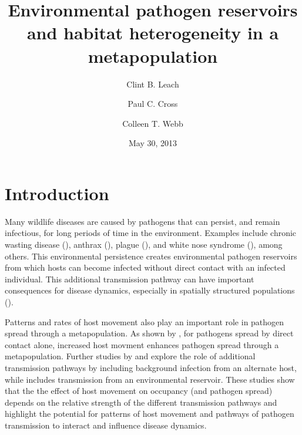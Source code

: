 \documentclass{svjour3}
\begin{document}
\title{Environmental pathogen reservoirs and habitat heterogeneity in a metapopulation}

\author{Clint B. Leach \and Paul C. Cross \and Colleen T. Webb}


\date{May 30, 2013}


\maketitle

\section{Introduction}
\label{intro}

Many wildlife diseases are caused by pathogens that can persist, and remain infectious, for long periods of time in the environment.  Examples include chronic wasting disease (\cite{Miller2006}), anthrax (\cite{Dragon1995}), plague (\cite{Eisen2008}), and white nose syndrome (\cite{Lindner2011}), among others.  This environmental persistence creates environmental pathogen reservoirs from which hosts can become infected without direct contact with an infected individual.  This additional transmission pathway can have important consequences for disease dynamics, especially in spatially structured populations (\cite{Park2012}).

Patterns and rates of host movement also play an important role in pathogen spread through a metapopulation.  As shown by \cite{Hess1996}, for pathogens spread by direct contact alone, increased host movment enhances pathogen spread through a metapopulation.  Further studies by \cite{Gog2002} and \cite{McCallum2002} explore the role of additional transmission pathways by including background infection from an alternate host, while \cite{Park2012} includes transmission from an environmental reservoir.  These studies show that the the effect of host movement on occupancy (and pathogen spread) depends on the relative strength of the different transmission pathways and highlight the potential for patterns of host movement and pathways of pathogen transmission to interact and influence disease dynamics.   
\end{document}
